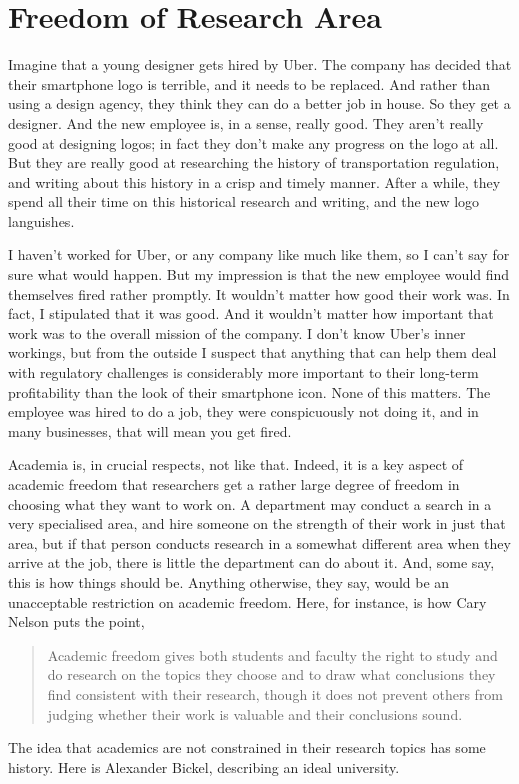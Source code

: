 \chapter{Freedom of Research Area}


Imagine that a young designer gets hired by Uber. The company has decided that their smartphone logo is terrible, and it needs to be replaced. And rather than using a design agency, they think they can do a better job in house. So they get a designer. And the new employee is, in a sense, really good. They aren't really good at designing logos; in fact they don't make any progress on the logo at all. But they are really good at researching the history of transportation regulation, and writing about this history in a crisp and timely manner. After a while, they spend all their time on this historical research and writing, and the new logo languishes.

I haven't worked for Uber, or any company like much like them, so I can't say for sure what would happen. But my impression is that the new employee would find themselves fired rather promptly. It wouldn't matter how good their work was. In fact, I stipulated that it was good. And it wouldn't matter how important that work was to the overall mission of the company. I don't know Uber's inner workings, but from the outside I suspect that anything that can help them deal with regulatory challenges is considerably more important to their long-term profitability than the look of their smartphone icon. None of this matters. The employee was hired to do a job, they were conspicuously not doing it, and in many businesses, that will mean you get fired.

Academia is, in crucial respects, not like that. Indeed, it is a key aspect of academic freedom that researchers get a rather large degree of freedom in choosing what they want to work on. A department may conduct a search in a very specialised area, and hire someone on the strength of their work in just that area, but if that person conducts research in a somewhat different area when they arrive at the job, there is little the department can do about it. And, some say, this is how things should be. Anything otherwise, they say, would be an unacceptable restriction on academic freedom. Here, for instance, is how Cary Nelson puts the point,

\begin{quote}

Academic freedom gives both students and faculty the right to study and do research on the topics they choose and to draw what conclusions they find consistent with their research, though it does not prevent others from judging whether their work is valuable and their conclusions sound.~\citep{Nelson2010} 
\end{quote}
The idea that academics are not constrained in their research topics has some history. Here is Alexander Bickel, describing an ideal university.

